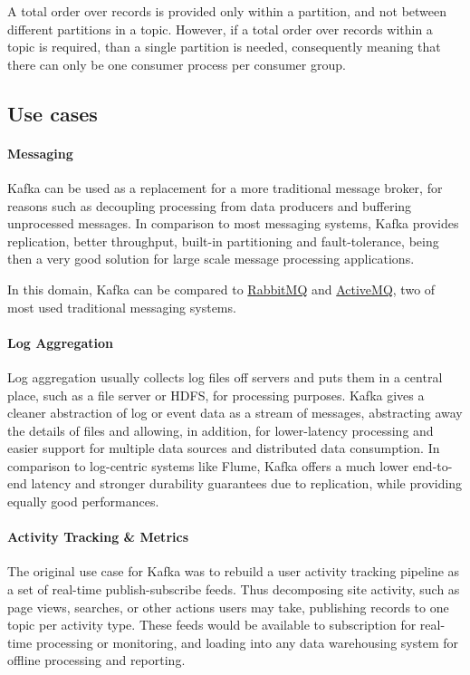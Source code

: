 A total order over records is provided only within a partition, and not between different partitions in a topic. However, if a total order over records within a topic is required, than a single partition is needed, consequently meaning that there can only be one consumer process per consumer group. 

\subsection{Use cases}

\paragraph{Messaging}

Kafka can be used as a replacement for a more traditional message broker, for reasons such as decoupling processing from data producers and buffering unprocessed messages. In comparison to most messaging systems, Kafka provides replication, better throughput, built-in partitioning and fault-tolerance, being then a very good solution for large scale message processing applications.

In this domain, Kafka can be compared to  \href{https://www.rabbitmq.com/}{RabbitMQ} and \href{http://activemq.apache.org/}{ActiveMQ}, two of most used traditional messaging systems.

\paragraph{Log Aggregation}

Log aggregation usually collects log files off servers and puts them in a central place, such as a file server or HDFS, for processing purposes. Kafka gives a cleaner abstraction of log or event data as a stream of messages, abstracting away the details of files and allowing, in addition, for lower-latency processing and easier support for multiple data sources and distributed data consumption. In comparison to log-centric systems like Flume, Kafka offers a much lower end-to-end latency and stronger durability guarantees due to replication, while providing equally good performances. 
 
\paragraph{Activity Tracking \& Metrics}

The original use case for Kafka was to rebuild a user activity tracking pipeline as a set of real-time publish-subscribe feeds. Thus decomposing site activity, such as page views, searches, or other actions users may take, publishing records to one topic per activity type. These feeds would be available to subscription for real-time processing or monitoring, and loading into any data warehousing system for offline processing and reporting.

